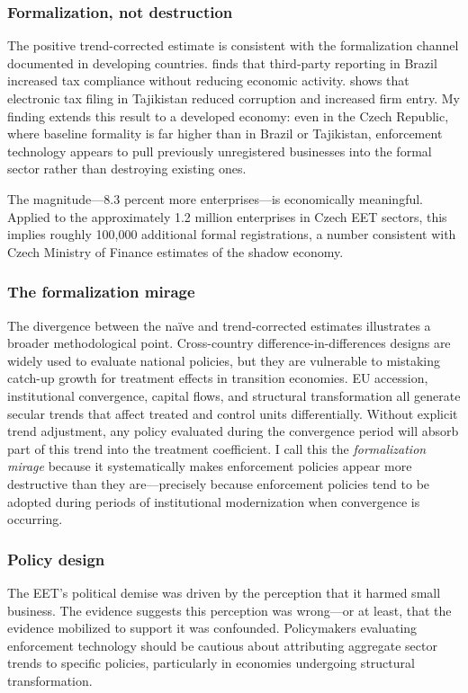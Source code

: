 \documentclass[12pt]{article}
\begin{document}
\subsubsection*{Formalization, not destruction} The positive trend-corrected estimate is consistent with the formalization channel documented in developing countries. \citet{naritomi2019} finds that third-party reporting in Brazil increased tax compliance without reducing economic activity. \citet{okunogbe2022} shows that electronic tax filing in Tajikistan reduced corruption and increased firm entry. My finding extends this result to a developed economy: even in the Czech Republic, where baseline formality is far higher than in Brazil or Tajikistan, enforcement technology appears to pull previously unregistered businesses into the formal sector rather than destroying existing ones.

The magnitude---8.3 percent more enterprises---is economically meaningful. Applied to the approximately 1.2 million enterprises in Czech EET sectors, this implies roughly 100,000 additional formal registrations, a number consistent with Czech Ministry of Finance estimates of the shadow economy.

\subsubsection*{The formalization mirage} The divergence between the na\"{i}ve and trend-corrected estimates illustrates a broader methodological point. Cross-country difference-in-differences designs are widely used to evaluate national policies, but they are vulnerable to mistaking catch-up growth for treatment effects in transition economies. EU accession, institutional convergence, capital flows, and structural transformation all generate secular trends that affect treated and control units differentially. Without explicit trend adjustment, any policy evaluated during the convergence period will absorb part of this trend into the treatment coefficient. I call this the \textit{formalization mirage} because it systematically makes enforcement policies appear more destructive than they are---precisely because enforcement policies tend to be adopted during periods of institutional modernization when convergence is occurring.

\subsubsection*{Policy design} The EET's political demise was driven by the perception that it harmed small business. The evidence suggests this perception was wrong---or at least, that the evidence mobilized to support it was confounded. Policymakers evaluating enforcement technology should be cautious about attributing aggregate sector trends to specific policies, particularly in economies undergoing structural transformation.
\end{document}
